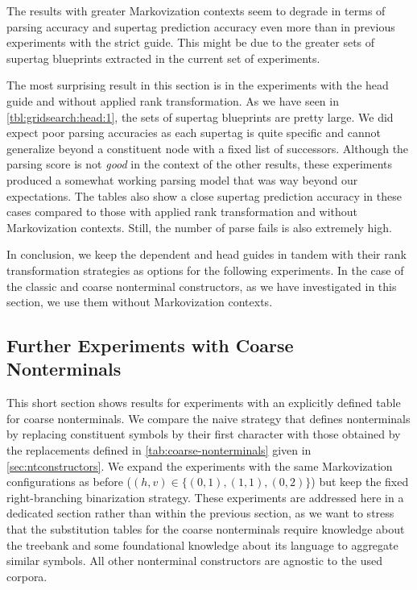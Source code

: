 \documentclass[../../document.tex]{subfiles}
\begin{document}
    The results with greater Markovization contexts seem to degrade in terms of parsing accuracy and supertag prediction accuracy even more than in previous experiments with the strict guide.
    This might be due to the greater sets of supertag blueprints extracted in the current set of experiments.

    The most surprising result in this section is in the experiments with the head guide and without applied rank transformation.
    As we have seen in \cref{tbl:gridsearch:head:1}, the sets of supertag blueprints are pretty large.
    We did expect poor parsing accuracies as each supertag is quite specific and cannot generalize beyond a constituent node with a fixed list of successors.
    Although the parsing score is not \emph{good} in the context of the other results, these experiments produced a somewhat working parsing model that was way beyond our expectations.
    The tables also show a close supertag prediction accuracy in these cases compared to those with applied rank transformation and without Markovization contexts. Still, the number of parse fails is also extremely high.

    In conclusion, we keep the dependent and head guides in tandem with their rank transformation strategies as options for the following experiments.
    In the case of the classic and coarse nonterminal constructors, as we have investigated in this section, we use them without Markovization contexts.

    \subsection{Further Experiments with Coarse Nonterminals}\label{sec:gridsearch:coarse}
    This short section shows results for experiments with an explicitly defined table for coarse nonterminals.
    We compare the naive strategy that defines nonterminals by replacing constituent symbols by their first character with those obtained by the replacements defined in \cref{tab:coarse-nonterminals} given in \cref{sec:ntconstructors}.
    We expand the experiments with the same Markovization configurations as before ($(h,v) \in \{(0,1), (1,1), (0,2)\}$) but keep the fixed right-branching binarization strategy.
    These experiments are addressed here in a dedicated section rather than within the previous section, as we want to stress that the substitution tables for the coarse nonterminals require knowledge about the treebank and some foundational knowledge about its language to aggregate similar symbols.
    All other nonterminal constructors are agnostic to the used corpora.
\end{document}
